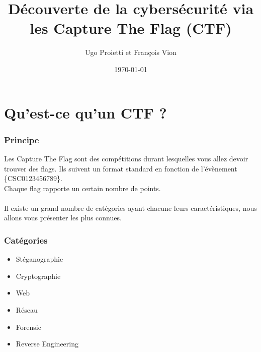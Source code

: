 \documentclass{beamer}
\title[Capture The Flag]{Découverte de la cybersécurité via les Capture The Flag (CTF)} %
\author{Ugo Proietti et François Vion} %
\institute[UMONS] %
{
Universtité de Mons \\ %
\medskip
}
\date{\today} %
\begin{document}
\begin{frame}
\titlepage %
\end{frame}

\begin{frame}
\frametitle{} %
\tableofcontents %
\end{frame}


\section{Qu'est-ce qu'un CTF ?} %

\begin{frame}
\frametitle{Principe}
Les Capture The Flag sont des compétitions durant lesquelles vous allez devoir trouver des flags. Ils suivent un format standard en fonction de l'évènement \{CSC0123456789\}. \\
Chaque flag rapporte un certain nombre de points. \\~\\

Il existe un grand nombre de catégories ayant chacune leurs caractéristiques, nous allons vous présenter les plus connues.
\end{frame}


\begin{frame}
\frametitle{Catégories}

\begin{itemize}
    \item Stéganographie
    \item Cryptographie
    \item Web
    \item Réseau
    \item Forensic
    \item Reverse Engineering
\end{itemize}

\end{frame}
\end{document}
